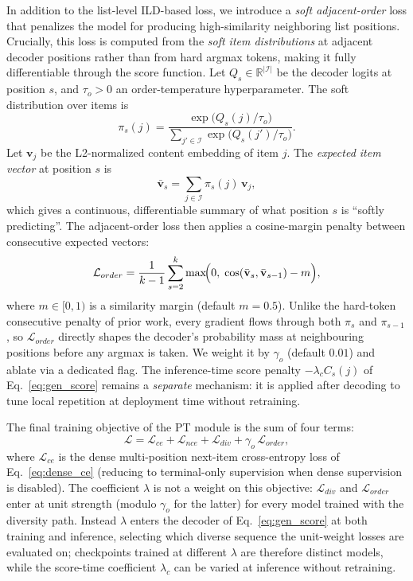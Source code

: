 In addition to the list-level ILD-based loss, we introduce a \emph{soft adjacent-order} loss that penalizes the model for producing high-similarity neighboring list positions. Crucially, this loss is computed from the \emph{soft item distributions} at adjacent decoder positions rather than from hard argmax tokens, making it fully differentiable through the score function. Let $Q_s \in \mathbb{R}^{|\mathcal{I}|}$ be the decoder logits at position $s$, and $\tau_o > 0$ an order-temperature hyperparameter. The soft distribution over items is
\begin{equation}
\pi_s(j) = \frac{\exp\!\bigl(Q_s(j)/\tau_o\bigr)}{\sum_{j' \in \mathcal{I}} \exp\!\bigl(Q_s(j')/\tau_o\bigr)}.
\end{equation}
Let $\mathbf{v}_j$ be the L2-normalized content embedding of item $j$. The \emph{expected item vector} at position $s$ is
\begin{equation}
\bar{\mathbf{v}}_s = \sum_{j \in \mathcal{I}} \pi_s(j)\,\mathbf{v}_j,
\end{equation}
which gives a continuous, differentiable summary of what position $s$ is ``softly predicting''. The adjacent-order loss then applies a cosine-margin penalty between consecutive expected vectors:
\begin{equation}
\label{eq:order_loss}
\mathcal{L}_{order} = \frac{1}{k-1}\sum_{s=2}^{k} \max\!\Bigl(0,\; \cos(\bar{\mathbf{v}}_s,\bar{\mathbf{v}}_{s-1}) - m\Bigr),
\end{equation}
where $m \in [0,1)$ is a similarity margin (default $m=0.5$). Unlike the hard-token consecutive penalty of prior work, every gradient flows through both $\pi_s$ and $\pi_{s-1}$, so $\mathcal{L}_{order}$ directly shapes the decoder's probability mass at neighbouring positions before any argmax is taken. We weight it by $\gamma_o$ (default $0.01$) and ablate via a dedicated flag. The inference-time score penalty $-\lambda_c C_s(j)$ of Eq.~\ref{eq:gen_score} remains a \emph{separate} mechanism: it is applied after decoding to tune local repetition at deployment time without retraining.

The final training objective of the PT module is the sum of four terms:
\begin{equation}
\label{eq:total_obj}
\mathcal{L} = \mathcal{L}_{ce} + \mathcal{L}_{nce} + \mathcal{L}_{div} + \gamma_o\,\mathcal{L}_{order},
\end{equation}
where $\mathcal{L}_{ce}$ is the dense multi-position next-item cross-entropy loss of Eq.~\ref{eq:dense_ce} (reducing to terminal-only supervision when dense supervision is disabled). The coefficient $\lambda$ is not a weight on this objective: $\mathcal{L}_{div}$ and $\mathcal{L}_{order}$ enter at unit strength (modulo $\gamma_o$ for the latter) for every model trained with the diversity path. Instead $\lambda$ enters the decoder of Eq.~\ref{eq:gen_score} at both training and inference, selecting which diverse sequence the unit-weight losses are evaluated on; checkpoints trained at different $\lambda$ are therefore distinct models, while the score-time coefficient $\lambda_c$ can be varied at inference without retraining.

